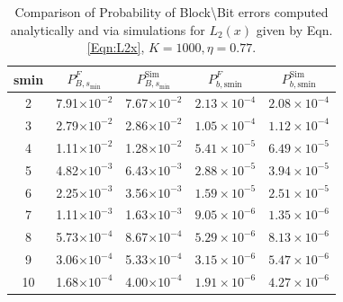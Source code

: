 %

\begin{table}
\centering
\begin{tabular}{c c c c c}
\hline  \hline
smin & $P_{B,s_{\text{min}}}^F$ & $P_{B,s_{\text{min}}}^{\text{Sim}}$& $P_{b,\text{smin}}^F$ & $P_{b,\text{smin}}^{\text{Sim}}$ \\
\hline
2 & 7.91$\times 10^{-2}$  &7.67$\times 10^{-2}$ &$2.13\times 10^{-4}$&$2.08\times 10^{-4}$\\
3 & 2.79$\times 10^{-2}$  &2.86$\times 10^{-2}$&$1.05\times 10^{-4}$&$1.12\times 10^{-4}$ \\
4 & 1.11$\times 10^{-2}$  &1.28$\times 10^{-2}$ &$5.41\times 10^{-5}$&$6.49\times 10^{-5}$\\
5 & 4.82$\times 10^{-3}$  &6.43$\times 10^{-3}$ & $2.88\times 10^{-5}$&$3.94\times 10^{-5}$\\
6 & 2.25$\times 10^{-3}$  &3.56$\times 10^{-3}$ &$1.59\times 10^{-5}$&$2.51\times 10^{-5}$\\
7 & 1.11$\times 10^{-3}$  &1.63$\times 10^{-3}$ &$9.05\times 10^{-6}$&$1.35\times 10^{-6}$\\
8 &5.73$\times 10^{-4}$   &8.67$\times 10^{-4}$ &$5.29\times 10^{-6}$&$8.13\times 10^{-6}$\\
9 & 3.06$\times 10^{-4}$  &5.33$\times 10^{-4}$ & $3.15\times 10^{-6}$&$5.47\times 10^{-6}$\\
10 & 1.68$\times 10^{-4}$ &4.00$\times 10^{-4}$&$1.91\times 10^{-6}$&$4.27\times 10^{-6}$\\
\end{tabular}
\caption{Comparison of Probability of Block\textbackslash Bit errors computed analytically and via simulations for $L_2(x)$ given by Eqn. \eqref{Eqn:L2x}, $K=1000, \eta=0.77$.}
\label{Table:SimvsAnalytic2}
\end{table}



